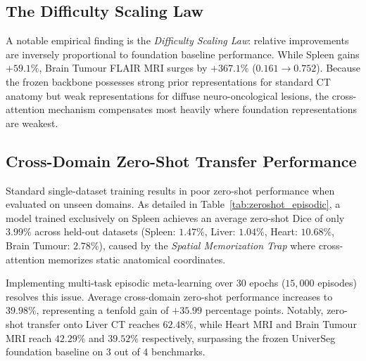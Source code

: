 \documentclass[runningheads]{llncs}
\begin{document}
\subsection{The Difficulty Scaling Law}
A notable empirical finding is the \textit{Difficulty Scaling Law}: relative improvements are inversely proportional to foundation baseline performance. While Spleen gains $+59.1\%$, Brain Tumour FLAIR MRI surges by $\mathbf{+367.1\%}$ ($0.161 \rightarrow 0.752$). Because the frozen backbone possesses strong prior representations for standard CT anatomy but weak representations for diffuse neuro-oncological lesions, the cross-attention mechanism compensates most heavily where foundation representations are weakest.

\subsection{Cross-Domain Zero-Shot Transfer Performance}
Standard single-dataset training results in poor zero-shot performance when evaluated on unseen domains. As detailed in Table~\ref{tab:zeroshot_episodic}, a model trained exclusively on Spleen achieves an average zero-shot Dice of only $3.99\%$ across held-out datasets (Spleen: $1.47\%$, Liver: $1.04\%$, Heart: $10.68\%$, Brain Tumour: $2.78\%$), caused by the \textit{Spatial Memorization Trap} where cross-attention memorizes static anatomical coordinates.

Implementing multi-task episodic meta-learning over 30 epochs ($15,000$ episodes) resolves this issue. Average cross-domain zero-shot performance increases to $39.98\%$, representing a tenfold gain of $+35.99$ percentage points. Notably, zero-shot transfer onto Liver CT reaches $62.48\%$, while Heart MRI and Brain Tumour MRI reach $42.29\%$ and $39.52\%$ respectively, surpassing the frozen UniverSeg foundation baseline on 3 out of 4 benchmarks.
\end{document}

